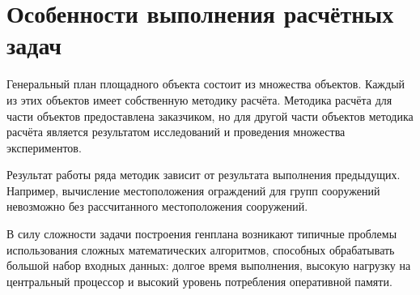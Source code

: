 \section{\Large{Особенности выполнения расчётных задач}}

Генеральный план площадного объекта состоит из множества объектов.
Каждый из этих объектов имеет собственную методику расчёта.
Методика расчёта для части объектов предоставлена заказчиком,
но для другой части объектов методика расчёта
является результатом исследований и проведения множества экспериментов.

Результат работы ряда методик зависит от результата выполнения предыдущих.
Например, вычисление местоположения ограждений для групп сооружений невозможно без рассчитанного
местоположения сооружений.

В силу сложности задачи построения генплана
возникают типичные проблемы использования сложных математических алгоритмов,
способных обрабатывать большой набор входных данных: долгое время выполнения,
высокую нагрузку на центральный процессор и высокий уровень потребления оперативной памяти.
